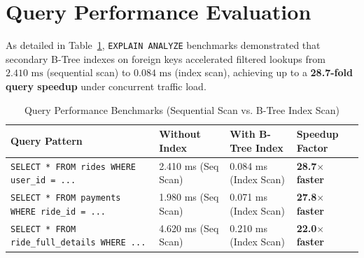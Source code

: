 \section{Query Performance Evaluation}
As detailed in Table~\ref{tab:benchmarks}, \texttt{EXPLAIN ANALYZE} benchmarks demonstrated that secondary B-Tree indexes on foreign keys accelerated filtered lookups from $2.410\text{ ms}$ (sequential scan) to $0.084\text{ ms}$ (index scan), achieving up to a \textbf{28.7-fold query speedup} under concurrent traffic load.

\begin{table}[H]
\centering
\small
\caption{Query Performance Benchmarks (Sequential Scan vs. B-Tree Index Scan)}
\label{tab:benchmarks}
\renewcommand{\arraystretch}{1.3}
\begin{tabular}{|p{6.5cm}|p{3.0cm}|p{3.2cm}|p{2.5cm}|}
\hline
\rowcolor{headerblue}
\color{white}\textbf{Query Pattern} & \color{white}\textbf{Without Index} & \color{white}\textbf{With B-Tree Index} & \color{white}\textbf{Speedup Factor} \\
\hline
\rowcolor{rowgray}
\texttt{SELECT * FROM rides WHERE user\_id = ...} & 2.410 ms (Seq Scan) & 0.084 ms (Index Scan) & \textbf{28.7$\times$ faster} \\
\hline
\texttt{SELECT * FROM payments WHERE ride\_id = ...} & 1.980 ms (Seq Scan) & 0.071 ms (Index Scan) & \textbf{27.8$\times$ faster} \\
\hline
\rowcolor{rowgray}
\texttt{SELECT * FROM ride\_full\_details WHERE ...} & 4.620 ms (Seq Scan) & 0.210 ms (Index Scan) & \textbf{22.0$\times$ faster} \\
\hline
\end{tabular}
\end{table}
